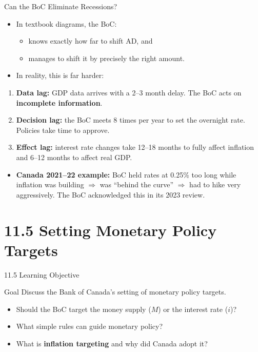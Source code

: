 \documentclass[aspectratio=169]{beamer}
\begin{document}
\begin{frame}{Can the BoC Eliminate Recessions?}
\transfade
\begin{itemize}[<+->]
  \item In textbook diagrams, the BoC:
  \begin{itemize}[<+->]
    \item knows exactly how far to shift AD, and
    \item manages to shift it by precisely the right amount.
  \end{itemize}
  \item In reality, this is far harder:
\end{itemize}
\begin{enumerate}[<+->]
  \item \textbf{Data lag:} GDP data arrives with a 2--3 month delay. The BoC acts on \textbf{incomplete information}.
  \item \textbf{Decision lag:} the BoC meets 8 times per year to set the overnight rate. Policies take time to approve.
  \item \textbf{Effect lag:} interest rate changes take \alert{12--18 months} to fully affect inflation and 6--12 months to affect real GDP.
\end{enumerate}
\begin{itemize}[<+->]
  \item \textbf{Canada 2021--22 example:} BoC held rates at 0.25\% too long while inflation was building $\Rightarrow$ was ``behind the curve'' $\Rightarrow$ had to hike very aggressively. The BoC acknowledged this in its 2023 review.
\end{itemize}
\end{frame}

\section{11.5 Setting Monetary Policy Targets}

\begin{frame}{11.5 Learning Objective}
\transfade
\begin{block}{Goal}
Discuss the Bank of Canada's setting of monetary policy targets.
\end{block}
\begin{itemize}[<+->]
  \item Should the BoC target the money supply ($M$) or the interest rate ($i$)?
  \item What simple rules can guide monetary policy?
  \item What is \textbf{inflation targeting} and why did Canada adopt it?
\end{itemize}
\end{frame}
\end{document}
